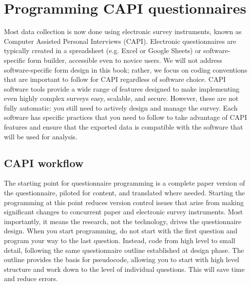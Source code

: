 {\section{Programming CAPI questionnaires}
Most data collection is now done using electronic survey instruments, known as Computer Assisted Personal Interviews (CAPI). 
Electronic questionnaires are typically created in a spreadsheet (e.g. Excel or Google Sheets) or software-specific form builder, accessible even to novice users. 
We will not address software-specific form design in this book; rather, we focus on coding conventions that are important to follow for CAPI regardless of software choice. 
CAPI software tools provide a wide range of features designed to make implementing even highly complex surveys easy, scalable, and secure. However, these are not fully automatic: you still need to actively design and manage the survey. Each software has specific practices that you need to follow to take advantage of CAPI features and ensure that the exported data is compatible with the software that will be used for analysis. 

\subsection{CAPI workflow}
The starting point for questionnaire programming is a complete paper version of the questionnaire, piloted for content, and translated where needed. Starting the programming at this point reduces version control issues that arise from making significant changes to concurrent paper and electronic survey instruments. Most importantly, it means the research, not the technology, drives the questionnaire design. When you start programming, do not start with the first question and program your way to the last question. Instead, code from high level to small detail, following the same questionnaire outline established at design phase. The outline provides the basis for pseudocode, allowing you to start with high level structure and work down to the level of individual questions. This will save time and reduce errors. 

}
